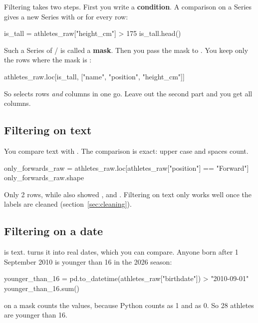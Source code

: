 \documentclass[11pt,a4paper]{article}
\begin{document}
Filtering takes two steps. First you write a \textbf{condition}. A
comparison on a Series gives a new Series with  or
 for every row:

\begin{python}
is_tall = athletes_raw["height_cm"] > 175
is_tall.head()
\end{python}

Such a Series of / is called a \textbf{mask}.
Then you pass the mask to . You keep only the rows where
the mask is :

\begin{python}
athletes_raw.loc[is_tall, ["name", "position", "height_cm"]]
\end{python}

So  selects rows \emph{and} columns in one go.
Leave out the second part and you get all columns.

\subsection{Filtering on text}

You compare text with \code{==}. The comparison is exact: upper case and
spaces count.

\begin{python}
only_forwards_raw = athletes_raw.loc[athletes_raw["position"] == "Forward"]
only_forwards_raw.shape
\end{python}

Only 2 rows, while  also showed ,
 and . Filtering on text only works well
once the labels are cleaned (section~\ref{sec:cleaning}).

\subsection{Filtering on a date}

 is text.  turns it into real
dates, which you can compare. Anyone born after 1 September 2010 is
younger than 16 in the 2026 season:

\begin{python}
younger_than_16 = pd.to_datetime(athletes_raw["birthdate"]) > "2010-09-01"
younger_than_16.sum()
\end{python}

 on a mask counts the  values, because Python
counts  as 1 and  as 0. So 28 athletes are
younger than 16.
\end{document}
